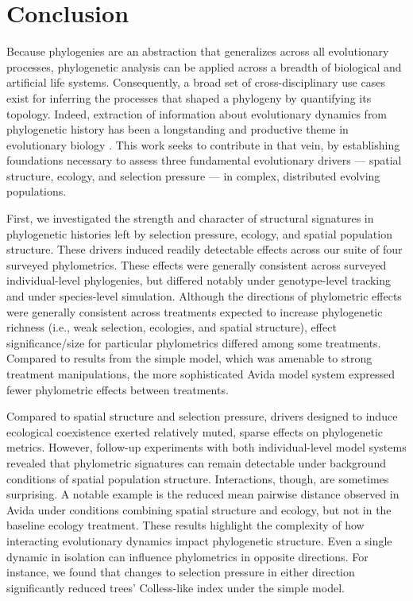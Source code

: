 \section{Conclusion}
\label{sec:conclusion}

Because phylogenies are an abstraction that generalizes across all evolutionary processes, phylogenetic analysis can be applied across a breadth of biological and artificial life systems.
Consequently, a broad set of cross-disciplinary use cases exist for inferring the processes that shaped a phylogeny by quantifying its topology.
Indeed, extraction of information about evolutionary dynamics from phylogenetic history has been a longstanding and productive theme in evolutionary biology \citep{pagel1997inferring}.
This work seeks to contribute in that vein, by establishing foundations necessary to assess three fundamental evolutionary drivers --- spatial structure, ecology, and selection pressure --- in complex, distributed evolving populations.

First, we investigated the strength and character of structural signatures in phylogenetic histories left by selection pressure, ecology, and spatial population structure.
These drivers induced readily detectable effects across our suite of four surveyed phylometrics.
These effects were generally consistent across surveyed individual-level phylogenies, but differed notably under genotype-level tracking and under species-level simulation.
Although the directions of phylometric effects were generally consistent across treatments expected to increase phylogenetic richness (i.e., weak selection, ecologies, and spatial structure), effect significance/size for particular phylometrics differed among some treatments.
Compared to results from the simple model, which was amenable to strong treatment manipulations, the more sophisticated Avida model system expressed fewer phylometric effects between treatments.

Compared to spatial structure and selection pressure, drivers designed to induce ecological coexistence exerted relatively muted, sparse effects on phylogenetic metrics.
However, follow-up experiments with both individual-level model systems revealed that phylometric signatures can remain detectable under background conditions of spatial population structure.
Interactions, though, are sometimes surprising.
A notable example is the reduced mean pairwise distance observed in Avida under conditions combining spatial structure and ecology, but not in the baseline ecology treatment.
These results highlight the complexity of how interacting evolutionary dynamics impact phylogenetic structure.
Even a single dynamic in isolation can influence phylometrics in opposite directions.
For instance, we found that changes to selection pressure in either direction significantly reduced trees' Colless-like index under the simple model.

